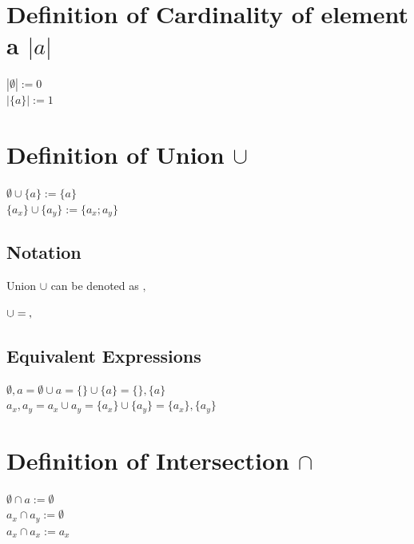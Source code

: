 \documentclass[11pt]{article}
\begin{document}
\section{Definition of Cardinality of element a $|a|$}
\begin{center}
$
|\emptyset| := 0
$
\\ \vspace{2mm}
$
|\{a\}| := 1
$
\end{center}





\section{Definition of Union $\cup$}
\begin{center}
$
\emptyset \cup \{a\} := \{a\}
$
\\ \vspace{2mm}
$
\{a_x\}\cup \{a_y\} := \{a_x; a_y\}
$
\end{center}





\subsection{Notation}
Union $\cup$ can be denoted as $,$
\begin{center}
$
\cup = \hspace{.8mm},
$
\end{center}




\subsection{Equivalent Expressions}
\begin{center}
$
\emptyset, a = \emptyset \cup a = \{\} \cup \{a\} = \{\} , \{a\} 
$
\\ \vspace{2mm}
$
a_x,a_y = a_x \cup a_y = \{a_x\} \cup \{a_y\} = \{a_x\},\{a_y\}
$
\end{center}




\section{Definition of Intersection $\cap$}
\begin{center}
$
\emptyset \cap a := \emptyset
$
\\ \vspace{2mm}
$
a_x \cap a_y := \emptyset
$
\\ \vspace{2mm}
$
a_x \cap a_x := a_x
$
\end{center}
\end{document}
